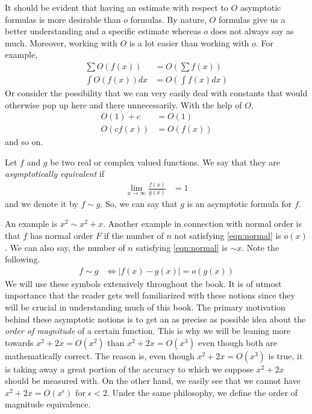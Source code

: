 \documentclass[elemannt.tex]{subfile}
\begin{document}
	It should be evident that having an estimate with respect to $O$ asymptotic formulas is more desirable than $o$ formulas. By nature, $O$ formulas give us a better understanding and a specific estimate whereas $o$ does not always say as much. Moreover, working with $O$ is a lot easier than working with $o$. For example,
		\begin{align*}
			\sum O(f(x))
				& = O\left(\sum f(x)\right)\\
			\int O(f(x))dx
				& = O\left(\int f(x)dx\right)
		\end{align*}
	Or consider the possibility that we can very easily deal with constants that would otherwise pop up here and there unnecessarily. With the help of $O$,
		\begin{align*}
			O(1)+c
				& = O(1)\\
			O(cf(x))
				& = O(f(x))
		\end{align*}
	and so on.
		\begin{definition}[Equivalence]
			Let $f$ and $g$ be two real or complex valued functions. We say that they are \textit{asymptotically equivalent} if
				\begin{align*}
					\lim\limits_{x\to\infty}\frac{f(x)}{g(x)}
						& = 1
				\end{align*}
			and we denote it by $f\sim g$. So, we can say that $g$ is an asymptotic formula for $f$.
		\end{definition}
	An example is $x^{2}\sim x^{2}+x$. Another example in connection with normal order is that $f$ has normal order $F$ if the number of $n$ not satisfying \ref{eqn:normal} is $o(x)$. We can also say, the number of $n$ satisfying \ref{eqn:normal} is $\sim x$. Note the following.
		\begin{align*}
			f \sim g
				& \iff |f(x)-g(x)|= o(g(x))
		\end{align*}
	We will use these symbols extensively throughout the book. It is of utmost importance that the reader gets well familiarized with these notions since they will be crucial in understanding much of this book. The primary motivation behind these asymptotic notions is to get an as precise as possible idea about the \textit{order of magnitude} of a certain function. This is why we will be leaning more towards $x^{2}+2x=O(x^{2})$ than $x^{2}+2x=O(x^{3})$ even though both are mathematically correct. The reason is, even though $x^{2}+2x=O(x^{3})$ is true, it is taking away a great portion of the accuracy to which we suppose $x^{2}+2x$ should be measured with. On the other hand, we easily see that we cannot have $x^{2}+2x=O(x^{\epsilon})$ for $\epsilon<2$. Under the same philosophy, we define the order of magnitude equivalence.
\end{document}

